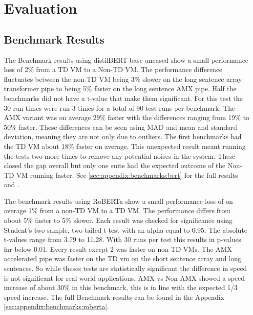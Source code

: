 
\chapter{Evaluation}
\label{ch:Evaluation}

\section{Benchmark Results}

The Benchmark results using distilBERT-base-uncased show a small performance loss of 2\% from a TD VM to a Non-TD VM. The performance difference fluctuates between the non-TD VM being 3\% slower on the long sentence array transformer pipe to being 5\% faster on the long sentence AMX pipe. Half the benchmarks did not have a t-value that make them significant. For this test the 30 run times were run 3 times for a total of 90 test runs per benchmark. The AMX variant was on average 29\% faster with the differences ranging from 19\% to 50\% faster.
These differences can be seen using MAD and mean and standard deviation, meaning they are not only due to outliers. The first benchmarks had the TD VM about 18\% faster on average. This unexpected result meant running the tests two more times to remove any potential noises in the system. These closed the gap overall but only one suite had the expected outcome of the Non-TD VM running faster. See \ref{sec:appendix:benchmarks:bert} for the full results and .

The benchmark results using RoBERTa show a small performance loss of on average 1\% from a non-TD VM to a TD VM. The performance differs from about 5\% faster to 5\% slower. Each result was checked for significance using Student’s two-sample, two-tailed t-test with an alpha equal to 0.95. The absolute t-values range from 3.79 to 11.28. With 30 runs per test this results in p-values far below 0.01. Every result except 2 was faster on non-TD VMs. The AMX accelerated pipe was faster on the TD vm on the short sentence array and long sentences. So while theses tests are statistically significant the difference in speed is not significant for real-world applications. AMX vs Non-AMX showed a speed increase of about 30\% in this benchmark, this is in line with the expected 1/3 speed increase.
The full Benchmark results can be found in the Appendix \ref{sec:appendix:benchmarks:roberta}.

